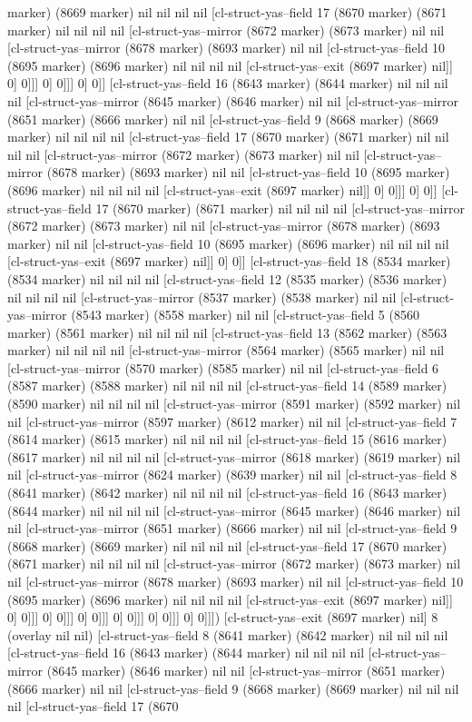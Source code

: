 {{marker) (8669 marker) nil nil nil nil [cl-struct-yas--field 17 (8670 marker) (8671 marker) nil nil nil nil [cl-struct-yas--mirror (8672 marker) (8673 marker) nil nil [cl-struct-yas--mirror (8678 marker) (8693 marker) nil nil [cl-struct-yas--field 10 (8695 marker) (8696 marker) nil nil nil nil [cl-struct-yas--exit (8697 marker) nil]] 0] 0]]] 0] 0]]] 0] 0]] [cl-struct-yas--field 16 (8643 marker) (8644 marker) nil nil nil nil [cl-struct-yas--mirror (8645 marker) (8646 marker) nil nil [cl-struct-yas--mirror (8651 marker) (8666 marker) nil nil [cl-struct-yas--field 9 (8668 marker) (8669 marker) nil nil nil nil [cl-struct-yas--field 17 (8670 marker) (8671 marker) nil nil nil nil [cl-struct-yas--mirror (8672 marker) (8673 marker) nil nil [cl-struct-yas--mirror (8678 marker) (8693 marker) nil nil [cl-struct-yas--field 10 (8695 marker) (8696 marker) nil nil nil nil [cl-struct-yas--exit (8697 marker) nil]] 0] 0]]] 0] 0]] [cl-struct-yas--field 17 (8670 marker) (8671 marker) nil nil nil nil [cl-struct-yas--mirror (8672 marker) (8673 marker) nil nil [cl-struct-yas--mirror (8678 marker) (8693 marker) nil nil [cl-struct-yas--field 10 (8695 marker) (8696 marker) nil nil nil nil [cl-struct-yas--exit (8697 marker) nil]] 0] 0]] [cl-struct-yas--field 18 (8534 marker) (8534 marker) nil nil nil nil [cl-struct-yas--field 12 (8535 marker) (8536 marker) nil nil nil nil [cl-struct-yas--mirror (8537 marker) (8538 marker) nil nil [cl-struct-yas--mirror (8543 marker) (8558 marker) nil nil [cl-struct-yas--field 5 (8560 marker) (8561 marker) nil nil nil nil [cl-struct-yas--field 13 (8562 marker) (8563 marker) nil nil nil nil [cl-struct-yas--mirror (8564 marker) (8565 marker) nil nil [cl-struct-yas--mirror (8570 marker) (8585 marker) nil nil [cl-struct-yas--field 6 (8587 marker) (8588 marker) nil nil nil nil [cl-struct-yas--field 14 (8589 marker) (8590 marker) nil nil nil nil [cl-struct-yas--mirror (8591 marker) (8592 marker) nil nil [cl-struct-yas--mirror (8597 marker) (8612 marker) nil nil [cl-struct-yas--field 7 (8614 marker) (8615 marker) nil nil nil nil [cl-struct-yas--field 15 (8616 marker) (8617 marker) nil nil nil nil [cl-struct-yas--mirror (8618 marker) (8619 marker) nil nil [cl-struct-yas--mirror (8624 marker) (8639 marker) nil nil [cl-struct-yas--field 8 (8641 marker) (8642 marker) nil nil nil nil [cl-struct-yas--field 16 (8643 marker) (8644 marker) nil nil nil nil [cl-struct-yas--mirror (8645 marker) (8646 marker) nil nil [cl-struct-yas--mirror (8651 marker) (8666 marker) nil nil [cl-struct-yas--field 9 (8668 marker) (8669 marker) nil nil nil nil [cl-struct-yas--field 17 (8670 marker) (8671 marker) nil nil nil nil [cl-struct-yas--mirror (8672 marker) (8673 marker) nil nil [cl-struct-yas--mirror (8678 marker) (8693 marker) nil nil [cl-struct-yas--field 10 (8695 marker) (8696 marker) nil nil nil nil [cl-struct-yas--exit (8697 marker) nil]] 0] 0]]] 0] 0]]] 0] 0]]] 0] 0]]] 0] 0]]] 0] 0]]]) [cl-struct-yas--exit (8697 marker) nil] 8 (overlay nil nil) [cl-struct-yas--field 8 (8641 marker) (8642 marker) nil nil nil nil [cl-struct-yas--field 16 (8643 marker) (8644 marker) nil nil nil nil [cl-struct-yas--mirror (8645 marker) (8646 marker) nil nil [cl-struct-yas--mirror (8651 marker) (8666 marker) nil nil [cl-struct-yas--field 9 (8668 marker) (8669 marker) nil nil nil nil [cl-struct-yas--field 17 (8670 }}
